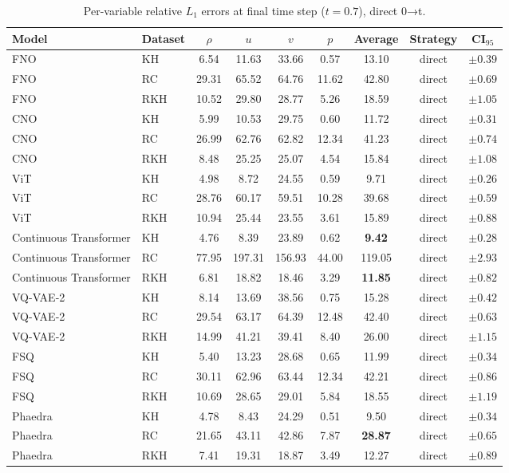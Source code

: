 \begin{table}[h]
    \centering
    \caption{Per-variable relative $L_1$ errors at final time step ($t=0.7$), direct 0→t.}
    \begin{tabular}{llccccccc}
        \toprule
        Model & Dataset  & $\rho$ & $u$ & $v$ & $p$ & Average & Strategy & CI$_{95}$ \\
        \midrule
        FNO & KH & 6.54 & 11.63 & 33.66 & 0.57 & 13.10 & direct & $\pm0.39$ \\
        FNO & RC & 29.31 & 65.52 & 64.76 & 11.62 & 42.80 & direct & $\pm0.69$ \\
        FNO & RKH & 10.52 & 29.80 & 28.77 & 5.26 & 18.59 & direct & $\pm1.05$ \\
        \midrule
        CNO & KH & 5.99 & 10.53 & 29.75 & 0.60 & 11.72 & direct & $\pm0.31$ \\
        CNO & RC & 26.99 & 62.76 & 62.82 & 12.34 & 41.23 & direct & $\pm0.74$ \\
        CNO & RKH & 8.48 & 25.25 & 25.07 & 4.54 & 15.84 & direct & $\pm1.08$ \\
        \midrule
        ViT & KH & 4.98 & 8.72 & 24.55 & 0.59 & 9.71 & direct & $\pm0.26$ \\
        ViT & RC & 28.76 & 60.17 & 59.51 & 10.28 & 39.68 & direct & $\pm0.59$ \\
        ViT & RKH & 10.94 & 25.44 & 23.55 & 3.61 & 15.89 & direct & $\pm0.88$ \\
        \midrule
        Continuous Transformer & KH & 4.76 & 8.39 & 23.89 & 0.62 & \textbf{9.42} & direct & $\pm0.28$ \\
        Continuous Transformer & RC & 77.95 & 197.31 & 156.93 & 44.00 & 119.05 & direct & $\pm2.93$ \\
        Continuous Transformer & RKH & 6.81 & 18.82 & 18.46 & 3.29 & \textbf{11.85} & direct & $\pm0.82$ \\
        \midrule
        VQ-VAE-2 & KH & 8.14 & 13.69 & 38.56 & 0.75 & 15.28 & direct & $\pm0.42$ \\
        VQ-VAE-2 & RC & 29.54 & 63.17 & 64.39 & 12.48 & 42.40 & direct & $\pm0.63$ \\
        VQ-VAE-2 & RKH & 14.99 & 41.21 & 39.41 & 8.40 & 26.00 & direct & $\pm1.15$ \\
        \midrule
        FSQ & KH & 5.40 & 13.23 & 28.68 & 0.65 & 11.99 & direct & $\pm0.34$ \\
        FSQ & RC & 30.11 & 62.96 & 63.44 & 12.34 & 42.21 & direct & $\pm0.86$ \\
        FSQ & RKH & 10.69 & 28.65 & 29.01 & 5.84 & 18.55 & direct & $\pm1.19$ \\
        \midrule
        Phaedra & KH & 4.78 & 8.43 & 24.29 & 0.51 & 9.50 & direct & $\pm0.34$ \\
        Phaedra & RC & 21.65 & 43.11 & 42.86 & 7.87 & \textbf{28.87} & direct & $\pm0.65$ \\
        Phaedra & RKH & 7.41 & 19.31 & 18.87 & 3.49 & 12.27 & direct & $\pm0.89$ \\
        \bottomrule
    \end{tabular}
\end{table}
